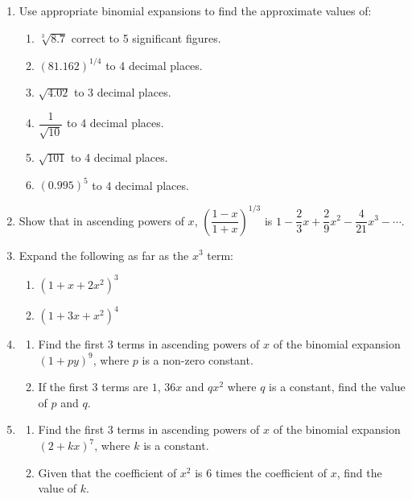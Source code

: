 \begin{enumerate}
\item Use appropriate binomial expansions to find the approximate values of:
\begin{enumerate}
  \item[a.] $\sqrt[3]{8.7}$ correct to 5 significant figures.
  \item[b.] $(81.162)^{1/4}$ to 4 decimal places.
  \item[c.] $\sqrt{4.02}$ to 3 decimal places.
  \item[d.] $\dfrac{1}{\sqrt{10}}$ to 4 decimal places.
  \item[e.] $\sqrt{101}$ to 4 decimal places.
  \item[f.] $(0.995)^5$ to 4 decimal places.
\end{enumerate}

\item Show that in ascending powers of $x$, $\left(\dfrac{1-x}{1+x}\right)^{1/3}$ is
$1 - \dfrac{2}{3}x + \dfrac{2}{9}x^2 - \dfrac{4}{21}x^3 - \cdots$.

\item Expand the following as far as the $x^3$ term:
\begin{enumerate}
  \item[a.] $(1+x+2x^2)^3$
  \item[b.] $(1+3x+x^2)^4$
\end{enumerate}

\item
\begin{enumerate}
  \item[a.] Find the first 3 terms in ascending powers of $x$ of the binomial
  expansion $(1+py)^9$, where $p$ is a non-zero constant.
  \item[b.] If the first 3 terms are $1$, $36x$ and $qx^2$ where $q$ is a constant, find
  the value of $p$ and $q$.
\end{enumerate}

\item
\begin{enumerate}
  \item[a.] Find the first 3 terms in ascending powers of $x$ of the binomial
  expansion $(2+kx)^7$, where $k$ is a constant.
  \item[b.] Given that the coefficient of $x^2$ is 6 times the coefficient of $x$, find
  the value of $k$.
\end{enumerate}

\end{enumerate}
